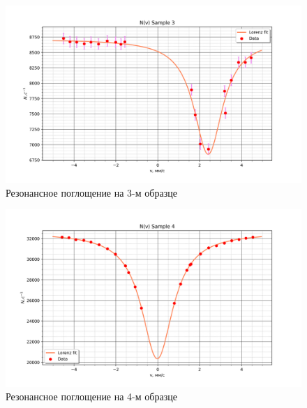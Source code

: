 \documentclass[a4paper]{article}
\begin{document}
\begin{figure}[H]
    \begin{center}
        \includegraphics[scale = 0.5]{S3fit.png}
        \caption{Резонансное поглощение на 3-м образце}
        \label{S3fit}
    \end{center}
\end{figure}

\begin{figure}[H]
    \begin{center}
        \includegraphics[scale = 0.5]{S4fit.png}
        \caption{Резонансное поглощение на 4-м образце}
        \label{S4fit}
    \end{center}
\end{figure}
\end{document}
